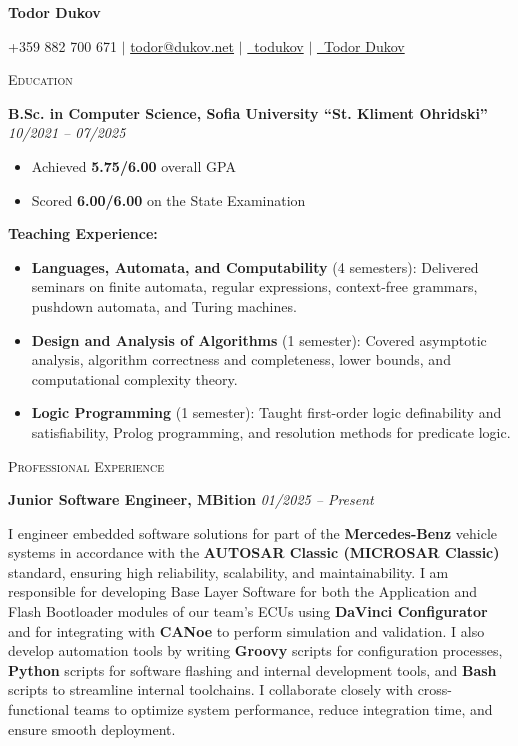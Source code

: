 \documentclass[a4paper,10pt]{article}
\newcommand{\textwithhr}[1]{
\textsc{#1}

\vspace{-5mm} \hrulefill
}
\begin{document}
\begin{center}
    \huge{\textbf{Todor Dukov}}

    \normalsize{+359 882 700 671 $\mid$ \href{mailto:todor@dukov.net}{todor@dukov.net} $\mid$ \href{https://github.com/toduko}{\faGithubSquare \, todukov} $\mid$ \href{https://www.linkedin.com/in/todor-dukov}{\faLinkedinSquare \, Todor Dukov}}
\end{center}

\textwithhr{Education}

\textbf{B.Sc. in Computer Science, Sofia University “St. Kliment Ohridski”} \hspace*{\fill} \textit{10/2021 -- 07/2025}

\begin{itemize}
    \item Achieved \textbf{5.75/6.00} overall GPA
    \item Scored \textbf{6.00/6.00} on the State Examination
\end{itemize}

\textbf{Teaching Experience:}
\begin{itemize}
  \item \textbf{Languages, Automata, and Computability} (4 semesters):  
        Delivered seminars on finite automata, regular expressions, context-free grammars, pushdown automata, and Turing machines.
  \item \textbf{Design and Analysis of Algorithms} (1 semester):  
        Covered asymptotic analysis, algorithm correctness and completeness, lower bounds, and computational complexity theory.
  \item \textbf{Logic Programming} (1 semester):  
        Taught first-order logic definability and satisfiability, Prolog programming, and resolution methods for predicate logic.
\end{itemize}

\textwithhr{Professional Experience}

\textbf{Junior Software Engineer, MBition} \hspace*{\fill} \textit{01/2025 -- Present}  

I engineer embedded software solutions for part of the \textbf{Mercedes-Benz} vehicle systems in accordance with the \textbf{AUTOSAR Classic (MICROSAR Classic)} standard, ensuring high reliability, scalability, and maintainability.  
I am responsible for developing Base Layer Software for both the Application and Flash Bootloader modules of our team's ECUs using \textbf{DaVinci Configurator} and for integrating with \textbf{CANoe} to perform simulation and validation.  
I also develop automation tools by writing \textbf{Groovy} scripts for configuration processes, \textbf{Python} scripts for software flashing and internal development tools, and \textbf{Bash} scripts to streamline internal toolchains.  
I collaborate closely with cross-functional teams to optimize system performance, reduce integration time, and ensure smooth deployment.  
\end{document}
